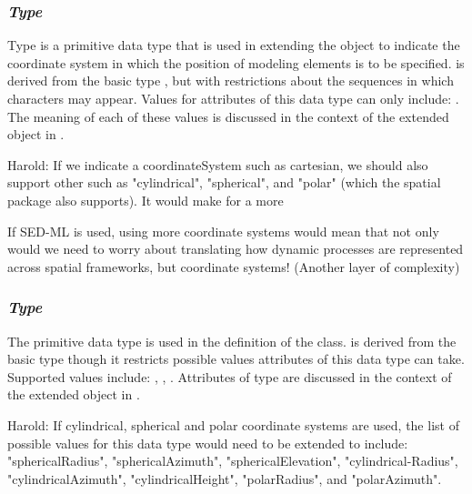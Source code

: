 \subsubsection{\emph{Type} }
\label{dat:CoordSystemKind}

Type  is a primitive data type that is used in extending the \Compartment object to indicate the coordinate system in which the position of modeling elements is to be specified.  is derived from the basic  type , but with restrictions about the sequences in which characters may appear. Values for attributes of this data type can only include: . The meaning of each of these values is discussed in the context of the extended \Compartment object in .

{\color{red} Harold: \notice  If we indicate a coordinateSystem such as cartesian, we should also support other such as "cylindrical", "spherical", and "polar" (which the spatial package also supports). It would make for a more 
	
If SED-ML is used, using more coordinate systems would mean that not only would we need to worry about translating how dynamic processes are represented across spatial frameworks, but coordinate systems! (Another layer of complexity)}

\subsubsection{\emph{Type} }
\label{dat:CoordKind}

The  primitive data type is used in the definition of the \CoordinateComponent class.  is derived from the basic  type  though it restricts possible values attributes of this data type can take. Supported values include: , , . Attributes of  type are discussed in the context of the extended \Compartment object in .

{\color{red} Harold: \notice If cylindrical, spherical and polar coordinate systems are used, the list of possible values for this data type would need to be extended to include: "sphericalRadius", "sphericalAzimuth", "sphericalElevation", "cylindrical-Radius", "cylindricalAzimuth", "cylindricalHeight", "polarRadius", and "polarAzimuth". }

